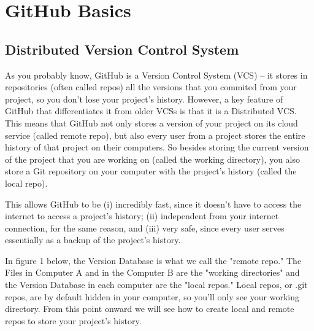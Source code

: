 \documentclass[12pt]{article}
\begin{document}
\section{GitHub Basics}

\subsection{Distributed Version Control System}
	As you probably know, GitHub is a Version Control System (VCS) -- it stores in repositories (often called repos) all the versions that you commited from your project, so you don't lose your project's history. However, a key feature of GitHub that differentiates it from older VCSs is that it is a Distributed VCS. This means that GitHub not only stores a version of your project on its cloud service (called remote repo), but also every user from a project stores the entire history of that project on their computers. So besides storing the current version of the project that you are working on (called the working directory), you also store a Git repository on your computer with the project's history (called the local repo). 

	This allows GitHub to be (i) incredibly fast, since it doesn't have to access the internet to access a project's history; (ii) independent from your internet connection, for the same reason, and (iii) very safe, since every user serves essentially as a backup of the project's history.

	In figure 1 below, the Version Database is what we call the "remote repo." The Files in Computer A and in the Computer B are the "working directories" and the Version Database in each computer are the "local repos." Local repos, or .git repos, are by default hidden in your computer, so you'll only see your working directory. From this point onward we will see how to create local and remote repos to store your project's history.
	
\end{document}
